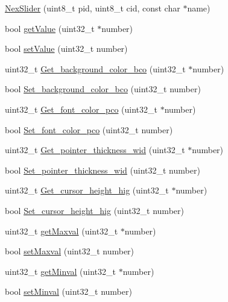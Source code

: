 \begin{DoxyCompactItemize}
\item 
\hyperlink{class_nex_slider_a00c5678209c936e9a57c14b6e2384774}{Nex\+Slider} (uint8\+\_\+t pid, uint8\+\_\+t cid, const char $\ast$name)
\item 
bool \hyperlink{class_nex_slider_a384d5488b421efd6affbfd32f45bb107}{get\+Value} (uint32\+\_\+t $\ast$number)
\item 
bool \hyperlink{class_nex_slider_a3f325bda4db913e302e94a4b25de7b5f}{set\+Value} (uint32\+\_\+t number)
\item 
uint32\+\_\+t \hyperlink{class_nex_slider_a1cf49184702852c0623a695f4b62b1ed}{Get\+\_\+background\+\_\+color\+\_\+bco} (uint32\+\_\+t $\ast$number)
\item 
bool \hyperlink{class_nex_slider_ac22c66fecb8cf03d554c3c86e6e798d5}{Set\+\_\+background\+\_\+color\+\_\+bco} (uint32\+\_\+t number)
\item 
uint32\+\_\+t \hyperlink{class_nex_slider_aa6361627b3c66ee7a569b5cfec4ce562}{Get\+\_\+font\+\_\+color\+\_\+pco} (uint32\+\_\+t $\ast$number)
\item 
bool \hyperlink{class_nex_slider_acc766d430c7a663846e4da6e1bacf76c}{Set\+\_\+font\+\_\+color\+\_\+pco} (uint32\+\_\+t number)
\item 
uint32\+\_\+t \hyperlink{class_nex_slider_a6adbc43b663e3542a92641c406db23ad}{Get\+\_\+pointer\+\_\+thickness\+\_\+wid} (uint32\+\_\+t $\ast$number)
\item 
bool \hyperlink{class_nex_slider_a6b91c1f7fddf7ea1b62c406453110ead}{Set\+\_\+pointer\+\_\+thickness\+\_\+wid} (uint32\+\_\+t number)
\item 
uint32\+\_\+t \hyperlink{class_nex_slider_a680c31b1aa2dc48a1193c9d8fb3cd487}{Get\+\_\+cursor\+\_\+height\+\_\+hig} (uint32\+\_\+t $\ast$number)
\item 
bool \hyperlink{class_nex_slider_a603cf3685c6d843261d8552030af9f22}{Set\+\_\+cursor\+\_\+height\+\_\+hig} (uint32\+\_\+t number)
\item 
uint32\+\_\+t \hyperlink{class_nex_slider_abf1b50605feb0ac2b381d1148795f0d9}{get\+Maxval} (uint32\+\_\+t $\ast$number)
\item 
bool \hyperlink{class_nex_slider_a5a1c65a9f2e21a624b78d5817d695503}{set\+Maxval} (uint32\+\_\+t number)
\item 
uint32\+\_\+t \hyperlink{class_nex_slider_ab98752f15d56dc04de102c0c2180ea11}{get\+Minval} (uint32\+\_\+t $\ast$number)
\item 
bool \hyperlink{class_nex_slider_ad38503fd3a6bfe3eaaa57764ac90f244}{set\+Minval} (uint32\+\_\+t number)
\end{DoxyCompactItemize}
